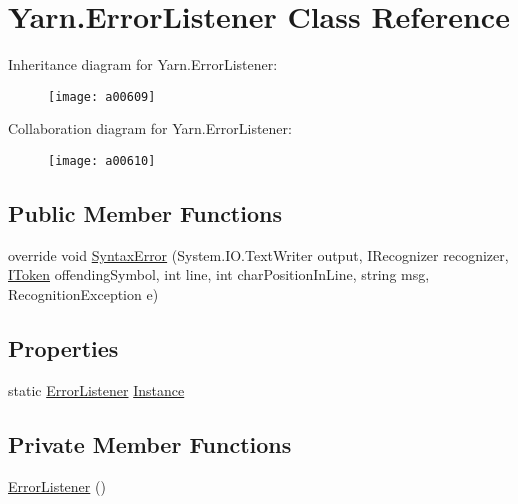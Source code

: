 \hypertarget{a00098}{\section{Yarn.\-Error\-Listener Class Reference}
\label{a00098}
}


Inheritance diagram for Yarn.\-Error\-Listener\-:
\nopagebreak
\begin{figure}[H]
\begin{center}
\leavevmode
\texttt{[image: a00609]}
\end{center}
\end{figure}


Collaboration diagram for Yarn.\-Error\-Listener\-:
\nopagebreak
\begin{figure}[H]
\begin{center}
\leavevmode
\texttt{[image: a00610]}
\end{center}
\end{figure}
\subsection*{Public Member Functions}
\begin{DoxyCompactItemize}
\item 
override void \hyperlink{a00098_a47fb9f6d50aa6a4e4796dea10b237fe4}{Syntax\-Error} (System.\-I\-O.\-Text\-Writer output, I\-Recognizer recognizer, \hyperlink{a00297_ae3d87b0b748ea892bff48f60862e182d}{I\-Token} offending\-Symbol, int line, int char\-Position\-In\-Line, string msg, Recognition\-Exception e)
\end{DoxyCompactItemize}
\subsection*{Properties}
\begin{DoxyCompactItemize}
\item 
static \hyperlink{a00098}{Error\-Listener} \hyperlink{a00098_a47b8f4f1d414afa1ea6067218c7ee34d}{Instance}
\end{DoxyCompactItemize}
\subsection*{Private Member Functions}
\begin{DoxyCompactItemize}
\item 
\hyperlink{a00098_a1f0cc41aac10bd8a2402355534c1123c}{Error\-Listener} ()
\end{DoxyCompactItemize}
